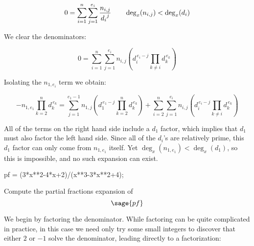 \begin{equation}
0=\sum_{i=1}^{n}\sum_{j=1}^{e_i} {n_{i,j}\over {d_i}^j}
\qquad \deg_x (n_{i,j}) < \deg_x (d_i)
\end{equation}

We clear the denominators:

\begin{equation}
0 =\sum_{i=1}^{n}\sum_{j=1}^{e_i} n_{i,j} \left( d_i^{\,e_i-j} \prod_{k \ne i} d_k^{\,e_k} \right)
\end{equation}

Isolating the $n_{1,e_i}$ term we obtain:

\begin{equation}
-n_{1,e_1}\prod_{k = 2}^{n} d_{k}^{\,e_k}=\sum_{j=1}^{e_1-1} n_{1,j} \left( d_1^{\,e_1-j} \prod_{k =2}^n d_k^{\,e_k} \right)
+ \sum_{i=2}^{n}\sum_{j=1}^{e_i} n_{i,j} \left( d_i^{\,e_i-j} \prod_{k \ne i} d_k^{\,e_k} \right)
\end{equation}


All of the terms on the right hand side include a $d_1$ factor, which implies that
$d_1$ must also factor the left hand side.
Since all of the $d_i$'s are relatively
prime, this $d_1$ factor can only come from
$n_{1,e_1}$ itself.  Yet
$\deg_x (n_{1,e_1}) < \deg_x (d_1)$, so this is impossible,
and no such expansion can exist.

\endtheorem



\vfill\eject

\example

\begin{sagecode}
pf = (3*x**2-4*x+2)/(x**3-3*x**2+4);
\end{sagecode}

Compute the partial fractions expansion of $$\sage{pf}$$

We begin by factoring the denominator.  While factoring can be quite
complicated in practice, in this case we need only try some small
integers to discover that either $2$ or $-1$ solve the denominator,
leading directly to a factorization:

